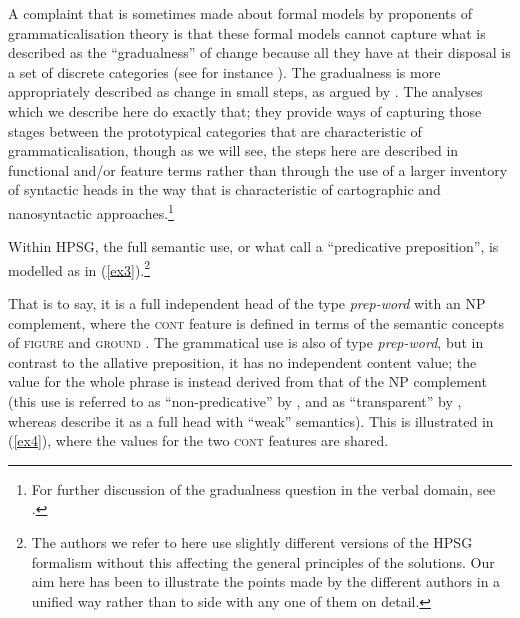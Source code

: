 \documentclass[output=paper]{langsci/langscibook}
\begin{document}
A complaint that is sometimes made about formal models by proponents of
grammaticalisation theory is that these formal models cannot capture what is
described as the ``gradualness'' of change because all they have at their
disposal is a set of discrete categories (see for instance
\citealt[330]{Haspelmath89}). The gradualness is more appropriately described
as change in small steps, as argued by \cite{Roberts10}. The analyses which we
describe here do exactly that; they provide ways of capturing those stages
between the prototypical categories that are characteristic of
grammaticalisation, though as we will see, the steps here are described in
functional and/or feature terms rather than through the use of a larger
inventory of syntactic heads in the way that is characteristic of cartographic
and nanosyntactic approaches.\footnote{For further discussion of the
gradualness question in the verbal domain, see \cite{BorjVinc19}.}

Within \gls{HPSG}, the full semantic use, or what \cite{PollSag94} call a
\enquote{predicative preposition}, is modelled as in (\ref{ex3}).\footnote{The
    authors we refer to here use slightly different versions of the \gls{HPSG}
    formalism without this affecting the general principles of the solutions.
    Our aim here has been to illustrate the points made by the different
authors in a unified way rather than to side with any one of them on detail.}

\begin{exe}
\ex\label{ex3}
\end{exe}

That is to say, it is a full independent head of the type \emph{prep-word} with
an NP complement, where the \textsc{cont} feature is defined in terms of the
semantic concepts of \textsc{figure} and \textsc{ground} \citep{Tseng00, Tseng02}.
The grammatical use is also of type \emph{prep-word}, but in contrast to the
allative preposition, it has no independent  content value; the value for the
whole phrase is instead derived from that of the NP complement (this use is
referred to as \enquote{non-predicative} by \citealt{PollSag94}, and as
\enquote{transparent} by \citealt{Flickinger08}, whereas
\citealt{Abeilleetal06} describe it as a full head with \enquote{weak}
semantics). This is illustrated in (\ref{ex4}), where the values for the two
\textsc{cont} features are shared.
\end{document}

